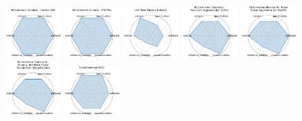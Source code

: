 \begin{figure}[ht!]
\\[1ex]
\includegraphics[width=0.1900\textwidth]{images/mlcommons_science_-_candle_uno_radar.pdf}
\includegraphics[width=0.1900\textwidth]{images/mlcommons_science_-_stemdl_radar.pdf}
\includegraphics[width=0.1900\textwidth]{images/lhc_new_physics_dataset_radar.pdf}
\includegraphics[width=0.1900\textwidth]{images/mlcommons_medical_ai_-_pancreas_segmentation_dfci_radar.pdf}
\includegraphics[width=0.1900\textwidth]{images/mlcommons_medical_ai_-_brain_tumor_segmentation_brats_radar.pdf}
\\[1ex]
\includegraphics[width=0.1900\textwidth]{images/mlcommons_medical_ai_-__surgical_workflow_phase_recognition_surgmlcube_radar.pdf}
\includegraphics[width=0.1900\textwidth]{images/calochallenge__radar.pdf}

\end{figure}
